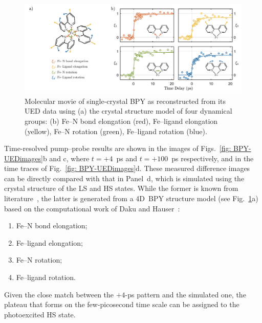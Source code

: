\begin{figure}[t!]
  \centering
  \includegraphics[width = \textwidth]{Figures/fig_BPY_UED_Xi.pdf}
  \caption[Molecular movie of single-crystal BPY.]{
    Molecular movie of single-crystal BPY as reconstructed
    from its UED data using (a) the crystal structure model of four dynamical groups:
    (b) Fe--N bond elongation (red), Fe--ligand elongation (yellow),
    Fe--N rotation (green), Fe--ligand rotation (blue).
  }
  \label{fig: BPY-UED-Xi}
\end{figure}

Time-resolved pump--probe results are shown in the images of Figs.~\ref{fig: BPY-UEDimages}b
and c, where $t = +4$~ps and $t = +100$~ps respectively,
and in the time traces of Fig.~\ref{fig: BPY-UEDimages}d.
%
These measured difference images can be directly compared with
that in Panel~d, which is simulated using the crystal structure of the LS
and HS states. While the former is known from literature~\cite{Dick1998},
the latter is generated from a 4D~BPY structure model (see Fig.~\ref{fig: BPY-UED-Xi}a)
based on the computational work of Daku and Hauser~\cite{Daku2010}:
%
\begin{enumerate}
  \item Fe--N bond elongation;
  \item Fe--ligand elongation;
  \item Fe--N rotation;
  \item Fe--ligand rotation.
\end{enumerate}

Given the close match between the $+4$-ps pattern and the simulated one,
the plateau that forms on the few-picosecond time scale can be assigned
to the photoexcited HS state.

